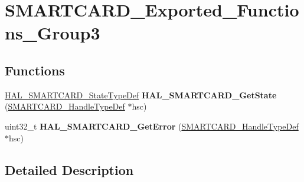 \hypertarget{group___s_m_a_r_t_c_a_r_d___exported___functions___group3}{}\section{S\+M\+A\+R\+T\+C\+A\+R\+D\+\_\+\+Exported\+\_\+\+Functions\+\_\+\+Group3}
\label{group___s_m_a_r_t_c_a_r_d___exported___functions___group3}
\subsection*{Functions}
\begin{DoxyCompactItemize}
\item 
\hyperlink{group___s_m_a_r_t_c_a_r_d___exported___types_ga79d6a3b95636861dcfd70913746e087e}{H\+A\+L\+\_\+\+S\+M\+A\+R\+T\+C\+A\+R\+D\+\_\+\+State\+Type\+Def} {\bfseries H\+A\+L\+\_\+\+S\+M\+A\+R\+T\+C\+A\+R\+D\+\_\+\+Get\+State} (\hyperlink{struct_s_m_a_r_t_c_a_r_d___handle_type_def}{S\+M\+A\+R\+T\+C\+A\+R\+D\+\_\+\+Handle\+Type\+Def} $\ast$hsc)\hypertarget{group___s_m_a_r_t_c_a_r_d___exported___functions___group3_ga0edb69af10195dfde9b0451943990ad0}{}\label{group___s_m_a_r_t_c_a_r_d___exported___functions___group3_ga0edb69af10195dfde9b0451943990ad0}

\item 
uint32\+\_\+t {\bfseries H\+A\+L\+\_\+\+S\+M\+A\+R\+T\+C\+A\+R\+D\+\_\+\+Get\+Error} (\hyperlink{struct_s_m_a_r_t_c_a_r_d___handle_type_def}{S\+M\+A\+R\+T\+C\+A\+R\+D\+\_\+\+Handle\+Type\+Def} $\ast$hsc)\hypertarget{group___s_m_a_r_t_c_a_r_d___exported___functions___group3_gaf42409d25813eeca7cca2df14a6f7b7a}{}\label{group___s_m_a_r_t_c_a_r_d___exported___functions___group3_gaf42409d25813eeca7cca2df14a6f7b7a}

\end{DoxyCompactItemize}


\subsection{Detailed Description}
